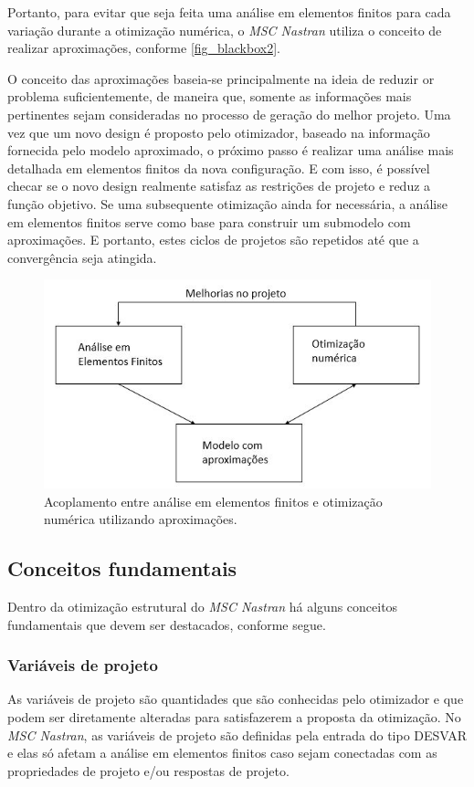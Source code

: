 Portanto, para evitar que seja feita uma análise em elementos finitos para cada variação durante a otimização numérica, o \emph{MSC Nastran} utiliza o conceito de realizar aproximações, conforme \autoref{fig_blackbox2}.

O conceito das aproximações baseia-se principalmente na ideia de reduzir or problema suficientemente, de maneira que, somente as informações mais pertinentes sejam consideradas no processo de geração do melhor projeto. Uma vez que um novo design é proposto pelo otimizador, baseado na informação fornecida pelo modelo aproximado, o próximo passo é realizar uma análise mais detalhada em elementos finitos da nova configuração. E com isso, é possível checar se o novo design realmente satisfaz as restrições de projeto e reduz a função objetivo. Se uma subsequente otimização ainda for necessária, a análise em elementos finitos serve como base para construir um submodelo com aproximações. E portanto, estes ciclos de projetos são repetidos até que a convergência seja atingida.

\begin{figure}[h]
	\caption{\label{fig_blackbox2}Acoplamento entre análise em elementos finitos e otimização numérica utilizando aproximações.}
  \centering
  \includegraphics[scale=0.7]{figura/Blackbox2}
\end{figure}

\subsection{Conceitos fundamentais}
Dentro da otimização estrutural do \emph{MSC Nastran} há alguns conceitos fundamentais que devem ser destacados, conforme segue.

\subsubsection{Variáveis de projeto}
As variáveis de projeto são quantidades que são conhecidas pelo otimizador e que podem ser diretamente alteradas para satisfazerem a proposta da otimização. No \emph{MSC Nastran}, as variáveis de projeto são definidas pela entrada do tipo DESVAR e elas só afetam a análise em elementos finitos caso sejam conectadas com as propriedades de projeto e/ou respostas de projeto.

